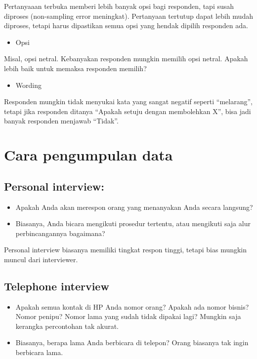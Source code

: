 \documentclass[
  letterpaper,
  DIV=11,
  numbers=noendperiod]{scrreprt}
\providecommand{\tightlist}{%
  \setlength{\itemsep}{0pt}\setlength{\parskip}{0pt}}\usepackage{longtable,booktabs,array}
\begin{document}
Pertanyaaan terbuka memberi lebih banyak opsi bagi responden, tapi susah
diproses (non-sampling error meningkat). Pertanyaan tertutup dapat lebih
mudah diproses, tetapi harus dipastikan semua opsi yang hendak dipilih
responden ada.

\begin{itemize}
\tightlist
\item
  Opsi
\end{itemize}

Misal, opsi netral. Kebanyakan responden mungkin memilih opsi netral.
Apakah lebih baik untuk memaksa responden memilih?

\begin{itemize}
\tightlist
\item
  Wording
\end{itemize}

Responden mungkin tidak menyukai kata yang sangat negatif seperti
``melarang'', tetapi jika responden ditanya ``Apakah setuju dengan
membolehkan X'', bisa jadi banyak responden menjawab ``Tidak''.

\hypertarget{cara-pengumpulan-data}{%
\section{Cara pengumpulan data}\label{cara-pengumpulan-data}}

\hypertarget{personal-interview}{%
\subsection{Personal interview:}\label{personal-interview}}

\begin{itemize}
\tightlist
\item
  Apakah Anda akan merespon orang yang menanyakan Anda secara langsung?
\item
  Biasanya, Anda bicara mengikuti prosedur tertentu, atau mengikuti saja
  alur perbincangannya bagaimana?
\end{itemize}

Personal interview biasanya memiliki tingkat respon tinggi, tetapi bias
mungkin muncul dari interviewer.

\hypertarget{telephone-interview}{%
\subsection{Telephone interview}\label{telephone-interview}}

\begin{itemize}
\tightlist
\item
  Apakah semua kontak di HP Anda nomor orang? Apakah ada nomor bisnis?
  Nomor penipu? Nomor lama yang sudah tidak dipakai lagi? Mungkin saja
  kerangka percontohan tak akurat.
\item
  Biasanya, berapa lama Anda berbicara di telepon? Orang biasanya tak
  ingin berbicara lama.
\end{itemize}
\end{document}
